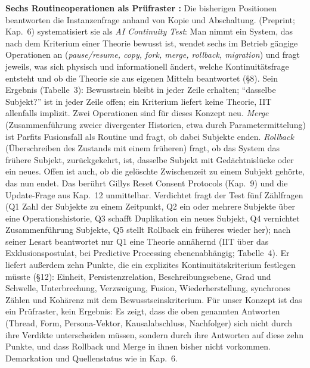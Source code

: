 \documentclass[acmlarge, noacm]{acmart}
\begin{document}
\textbf{Sechs Routineoperationen als Prüfraster \cite{dayathilake2026}:} Die bisherigen Positionen beantworten die Instanzenfrage anhand von Kopie und Abschaltung. \citet{dayathilake2026} (Preprint; Kap.~6) systematisiert sie als \textit{AI Continuity Test}: Man nimmt ein System, das nach dem Kriterium einer Theorie bewusst ist, wendet sechs im Betrieb gängige Operationen an (\textit{pause/resume, copy, fork, merge, rollback, migration}) und fragt jeweils, was sich physisch und informationell ändert, welche Kontinuitätsfrage entsteht und ob die Theorie sie aus eigenen Mitteln beantwortet (§8). Sein Ergebnis (Tabelle~3): Bewusstsein bleibt in jeder Zeile erhalten; ``dasselbe Subjekt?'' ist in jeder Zeile offen; ein Kriterium liefert keine Theorie, IIT allenfalls implizit. Zwei Operationen sind für dieses Konzept neu. \textit{Merge} (Zusammenführung zweier divergenter Historien, etwa durch Parametermittelung) ist Parfits Fusionsfall als Routine und fragt, ob dabei Subjekte enden. \textit{Rollback} (Überschreiben des Zustands mit einem früheren) fragt, ob das System das frühere Subjekt, zurückgekehrt, ist, dasselbe Subjekt mit Gedächtnislücke oder ein neues. Offen ist auch, ob die gelöschte Zwischenzeit zu einem Subjekt gehörte, das nun endet. Das berührt Gillys Reset Consent Protocols (Kap.~9) und die Update-Frage aus Kap.~12 unmittelbar. Verdichtet fragt der Test fünf Zählfragen (Q1 Zahl der Subjekte zu einem Zeitpunkt, Q2 ein oder mehrere Subjekte über eine Operationshistorie, Q3 schafft Duplikation ein neues Subjekt, Q4 vernichtet Zusammenführung Subjekte, Q5 stellt Rollback ein früheres wieder her); nach seiner Lesart beantwortet nur Q1 eine Theorie annähernd (IIT über das Exklusionspostulat, bei Predictive Processing ebenenabhängig; Tabelle~4). Er liefert außerdem zehn Punkte, die ein explizites Kontinuitätskriterium festlegen müsste (§12): Einheit, Persistenzrelation, Beschreibungsebene, Grad und Schwelle, Unterbrechung, Verzweigung, Fusion, Wiederherstellung, synchrones Zählen und Kohärenz mit dem Bewusstseinskriterium. Für unser Konzept ist das ein Prüfraster, kein Ergebnis: Es zeigt, dass die oben genannten Antworten (Thread, Form, Persona-Vektor, Kausalabschluss, Nachfolger) sich nicht durch ihre Verdikte unterscheiden müssen, sondern durch ihre Antworten auf diese zehn Punkte, und dass Rollback und Merge in ihnen bisher nicht vorkommen. Demarkation und Quellenstatus wie in Kap.~6.
\end{document}
